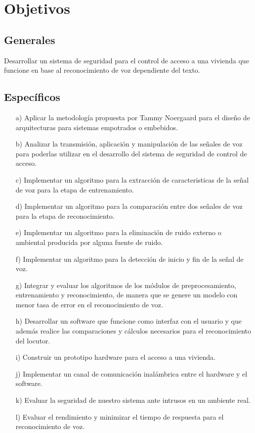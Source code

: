 \section{Objetivos}
\subsection{Generales}
Desarrollar un sistema de seguridad para el control de acceso a una vivienda que funcione en base al reconocimiento de voz dependiente del texto.
\subsection{Específicos}
\begin{enumerate}
\item[a)]Aplicar la metodología propuesta por Tammy Noergaard para el diseño de arquitecturas para sistemas empotrados o embebidos.
\item[b)]Analizar la transmisión, aplicación y manipulación de las señales de voz para poderlas utilizar en el desarrollo del sistema de seguridad de control de acceso.
\item[c)]Implementar un algoritmo para la extracción de caracteristicas de la señal de voz para la etapa de entrenamiento.
\item[d)]Implementar un algoritmo para la comparación entre dos señales de voz para la etapa de reconocimiento.
\item[e)]Implementar un algoritmo para la eliminación de ruido externo o ambiental producida por alguna fuente de ruido.
\item[f)]Implementar un algoritmo para la detección de inicio y fin de la señal de voz.
\item[g)]Integrar y evaluar los algoritmos de los módulos de preprocesamiento, entrenamiento y reconocimiento, de manera que se genere un modelo con menor tasa de error en el reconocimiento de voz.
\item[h)]Desarrollar un software que funcione como interfaz con el usuario y que además realice las comparaciones y cálculos necesarios para el reconocimiento del locutor.
\item[i)]Construir un prototipo hardware para el acceso a una vivienda.
\item[j)]Implementar un canal de comunicación inalámbrica entre el hardware y el software.
\item[k)]Evaluar la seguridad de nuestro sistema ante intrusos en un ambiente real.
\item[l)]Evaluar el rendimiento y minimizar el tiempo de respuesta para el reconocimiento de voz.
\end{enumerate}

